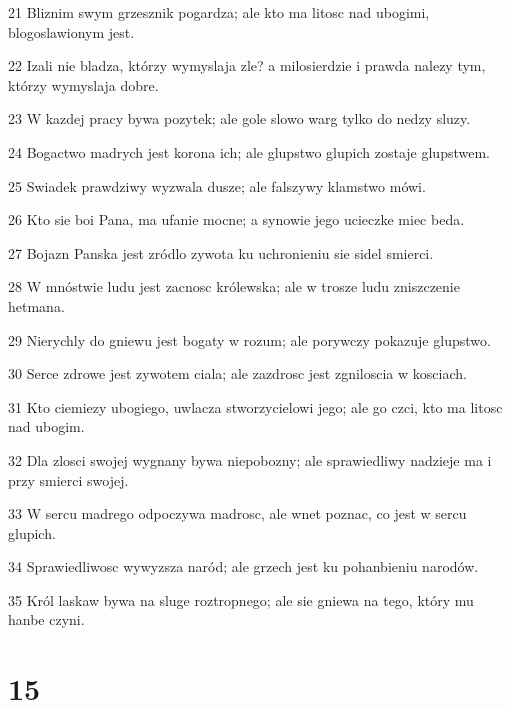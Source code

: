 \par 21 Bliznim swym grzesznik pogardza; ale kto ma litosc nad ubogimi, blogoslawionym jest.
\par 22 Izali nie bladza, którzy wymyslaja zle? a milosierdzie i prawda nalezy tym, którzy wymyslaja dobre.
\par 23 W kazdej pracy bywa pozytek; ale gole slowo warg tylko do nedzy sluzy.
\par 24 Bogactwo madrych jest korona ich; ale glupstwo glupich zostaje glupstwem.
\par 25 Swiadek prawdziwy wyzwala dusze; ale falszywy klamstwo mówi.
\par 26 Kto sie boi Pana, ma ufanie mocne; a synowie jego ucieczke miec beda.
\par 27 Bojazn Panska jest zródlo zywota ku uchronieniu sie sidel smierci.
\par 28 W mnóstwie ludu jest zacnosc królewska; ale w trosze ludu zniszczenie hetmana.
\par 29 Nierychly do gniewu jest bogaty w rozum; ale porywczy pokazuje glupstwo.
\par 30 Serce zdrowe jest zywotem ciala; ale zazdrosc jest zgniloscia w kosciach.
\par 31 Kto ciemiezy ubogiego, uwlacza stworzycielowi jego; ale go czci, kto ma litosc nad ubogim.
\par 32 Dla zlosci swojej wygnany bywa niepobozny; ale sprawiedliwy nadzieje ma i przy smierci swojej.
\par 33 W sercu madrego odpoczywa madrosc, ale wnet poznac, co jest w sercu glupich.
\par 34 Sprawiedliwosc wywyzsza naród; ale grzech jest ku pohanbieniu narodów.
\par 35 Król laskaw bywa na sluge roztropnego; ale sie gniewa na tego, który mu hanbe czyni.

\chapter{15}

